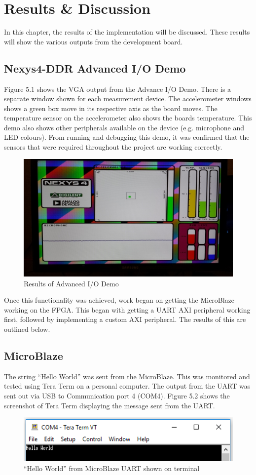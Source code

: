 \documentclass[12pt,a4paper]{report} %
\begin{document}
\chapter{Results \& Discussion}
In this chapter, the results of the implementation will be discussed.
These results will show the various outputs from the development board.
\section{Nexys4-DDR Advanced I/O Demo}
Figure 5.1 shows the VGA output from the Advance I/O Demo.
There is a separate window shown for each measurement device.
The accelerometer windows shows a green box move in its respective axis as the board moves.
The temperature sensor on the accelerometer also shows the boards temperature.
This demo also shows other peripherals available on the device (e.g. microphone and LED colours).
From running and debugging this demo, it was confirmed that the sensors that were required throughout the project are working correctly.
\begin{figure}[ht]
\centerline{\includegraphics[scale=0.7]{diagrams/image29}}
\caption{Results of Advanced I/O Demo}
\end{figure}

Once this functionality was achieved, work began on getting the MicroBlaze working on the FPGA.
This began with getting a UART AXI peripheral working first, followed by implementing a custom AXI peripheral.
The results of this are outlined below.
\section{MicroBlaze}
The string ``Hello World'' was sent from the MicroBlaze.
This was monitored and tested using Tera Term on a personal computer.
The output from the UART was sent out via USB to Communication port 4 (COM4).
Figure 5.2 shows the screenshot of Tera Term displaying the message sent from the UART.
\begin{figure}[ht]
\centerline{\includegraphics[scale=0.9]{diagrams/image30}}
\caption{``Hello World'' from MicroBlaze UART shown on terminal}
\end{figure}
\end{document}
